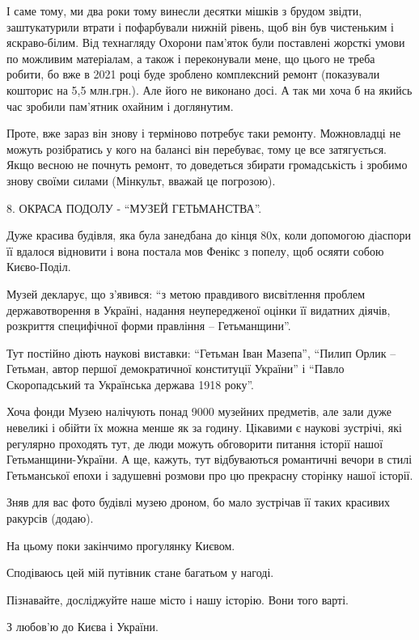 І саме тому, ми два роки тому винесли десятки мішків з брудом звідти,
заштукатурили втрати і пофарбували нижній рівень, щоб він був чистеньким і
яскраво-білим. Від технагляду Охорони пам'яток були поставлені жорсткі умови по
можливим матеріалам, а також і переконували мене, що цього не треба робити, бо
вже в 2021 році буде зроблено комплексний ремонт (показували кошторис на 5,5
млн.грн.). Але його не виконано досі. А так ми хоча б на якийсь час зробили
пам'ятник охайним і доглянутим. 

Проте, вже зараз він знову і терміново потребує таки ремонту. Можновладці не
можуть розібратись у кого на балансі він перебуває, тому це все затягується.
Якщо весною не почнуть ремонт, то доведеться збирати громадськість і зробимо
знову своїми силами (Мінкульт, вважай це погрозою). 


8. ОКРАСА ПОДОЛУ - \enquote{МУЗЕЙ ГЕТЬМАНСТВА}. 

Дуже красива будівля, яка була занедбана до кінця 80х, коли допомогою діаспори
її вдалося відновити і вона постала мов Фенікс з попелу, щоб осяяти собою
Києво-Поділ.

Музей декларує, що з’явився: \enquote{з метою правдивого висвітлення проблем
державотворення в Україні, надання неупередженої оцінки її видатних діячів,
розкриття специфічної форми правління – Гетьманщини}.

Тут постійно діють наукові виставки: \enquote{Гетьман Іван Мазепа},
\enquote{Пилип Орлик – Гетьман, автор першої демократичної конституції України}
і \enquote{Павло Скоропадський та Українська держава 1918 року}. 

Хоча фонди Музею налічують понад 9000 музейних предметів, але зали дуже
невеликі і обійти їх можна менше як за годину. Цікавими є наукові зустрічі, які
регулярно проходять тут, де люди можуть обговорити питання історії нашої
Гетьманщини-України. А ще, кажуть, тут відбуваються романтичні вечори в стилі
Гетьманської епохи і задушевні розмови про цю прекрасну сторінку нашої історії.

Зняв для вас фото будівлі музею дроном, бо мало зустрічав її таких красивих
ракурсів (додаю). 

На цьому поки закінчимо прогулянку Києвом.

Сподіваюсь цей мій путівник стане багатьом у нагоді.

Пізнавайте, досліджуйте наше місто і нашу історію. Вони того варті.

З любов'ю до Києва і України.

